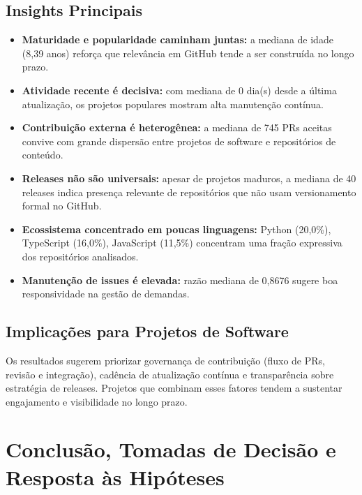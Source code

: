 \documentclass[10pt,a4paper,twocolumn]{article}
\begin{document}
\subsection{Insights Principais}

\begin{itemize}
  \item \textbf{Maturidade e popularidade caminham juntas:} a mediana de idade
    (8,39 anos) reforça que relevância em GitHub tende a ser
    construída no longo prazo.

  \item \textbf{Atividade recente é decisiva:} com mediana de 0
    dia(s) desde a última atualização, os projetos populares mostram alta
    manutenção contínua.

  \item \textbf{Contribuição externa é heterogênea:} a mediana de
    745 PRs aceitas convive com grande dispersão entre projetos
    de software e repositórios de conteúdo.

  \item \textbf{Releases não são universais:} apesar de projetos maduros,
    a mediana de 40 releases indica presença relevante de
    repositórios que não usam versionamento formal no GitHub.

  \item \textbf{Ecossistema concentrado em poucas linguagens:} Python (20,0\%), TypeScript (16,0\%), JavaScript (11,5\%)
    concentram uma fração expressiva dos repositórios analisados.

  \item \textbf{Manutenção de issues é elevada:} razão mediana de
    0,8676 sugere boa responsividade na gestão de demandas.
\end{itemize}

\subsection{Implicações para Projetos de Software}

Os resultados sugerem priorizar governança de contribuição (fluxo de PRs,
revisão e integração), cadência de atualização contínua e transparência sobre
estratégia de releases. Projetos que combinam esses fatores tendem a sustentar
engajamento e visibilidade no longo prazo.

\clearpage
\onecolumn

\section{Conclusão, Tomadas de Decisão e Resposta às Hipóteses}
\end{document}
